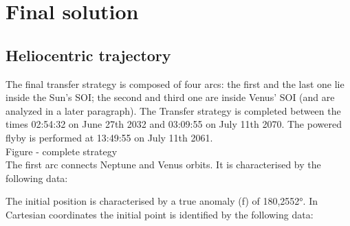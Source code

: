 \documentclass[11pt,a4paper]{report}
\begin{document}
\section{Final solution}

\subsection{Heliocentric trajectory}
The final transfer strategy is composed of four arcs: the first and the last one lie inside the Sun’s SOI; the second and third one are inside Venus’ SOI (and are analyzed in a later paragraph). 
The Transfer strategy is completed between the times 02:54:32 on June 27th 2032 and 03:09:55 on July 11th 2070. The powered flyby is performed at 13:49:55 on July 11th 2061.\\
Figure - complete strategy\\
The first arc connects Neptune and Venus orbits. It is characterised by the following data:

\begin{table}[H]
\centering
{}
\end{table}

The initial position is characterised by a true anomaly (f) of 180,2552°. In Cartesian coordinates the initial point is identified by the following data:

\begin{table}[H]
\centering
{}
\end{table}
\end{document}
